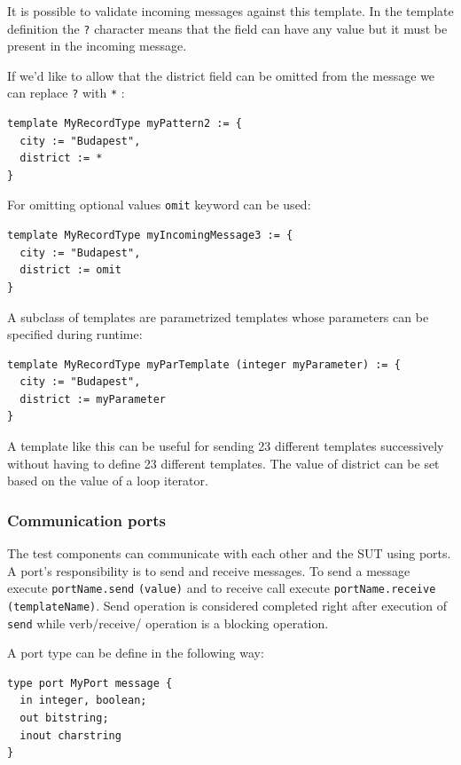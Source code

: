 \documentclass[a4paper]{article}
\begin{document}
It is possible to validate incoming messages against this template.
In the template definition the \verb/?/ character means that the field can have any value but it
must be present in the incoming message.

If we'd like to allow that the district field can be omitted from the message we can replace
\verb/?/ with \verb/*/ :
{\footnotesize
\begin{lstlisting}
template MyRecordType myPattern2 := {
  city := "Budapest",
  district := *
}
\end{lstlisting}
}

For omitting optional values \verb/omit/ keyword can be used:
{\footnotesize
\begin{lstlisting}
template MyRecordType myIncomingMessage3 := {
  city := "Budapest",
  district := omit
}
\end{lstlisting}
}

A subclass of templates are parametrized templates whose parameters can be specified during runtime:

{\footnotesize
\begin{lstlisting}
template MyRecordType myParTemplate (integer myParameter) := {
  city := "Budapest",
  district := myParameter
}
\end{lstlisting}
}

A template like this can be useful for sending 23 different templates successively without having to define 23
different templates. The value of district can be set based on the value of a loop iterator.

\subsubsection{Communication ports}

The test components can communicate with each other and the SUT using ports. A port's responsibility is to send and
receive messages. To send a message execute \verb/portName.send/ \verb/(value)/ and to receive
call execute \verb/portName.receive/ \verb/(templateName)/. Send operation is considered completed right
after execution of \verb/send/ while verb/receive/ operation is a blocking operation.

A port type can be define in the following way:
{\footnotesize
\begin{lstlisting}
type port MyPort message {
  in integer, boolean;
  out bitstring;
  inout charstring
}
\end{lstlisting}
}
\end{document}
